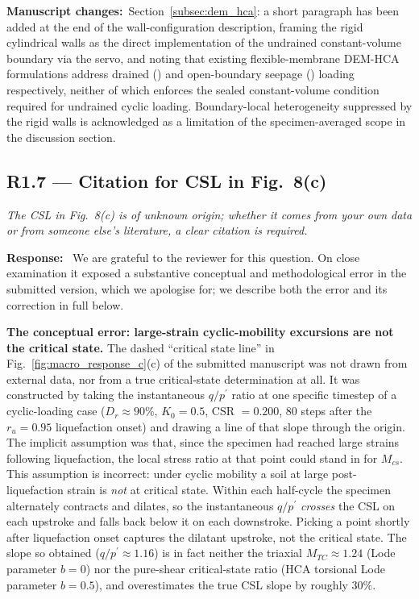 \documentclass[11pt,a4paper]{article}
\newenvironment{rcomment}
  {\begin{leftbar}\color{black!75}\itshape}
  {\end{leftbar}\vspace{0.3em}}
\newcommand{\response}{\par\noindent\textbf{Response:}\ \ignorespaces}
\newcommand{\changed}[1]{\par\noindent\textbf{Manuscript changes:}\ #1\par}
\newcommand{\Kzero}{\ensuremath{K_0}}
\newcommand{\ru}{\ensuremath{r_u}}
\begin{document}
\changed{Section~\ref{subsec:dem_hca}: a short paragraph has been
added at the end of the wall-configuration description, framing the
rigid cylindrical walls as the direct implementation of the undrained
constant-volume boundary via the servo, and noting that existing
flexible-membrane DEM-HCA formulations address drained
(\citealp{Song2024}) and open-boundary seepage
(\citealp{Song2024suffusion}) loading respectively, neither of which
enforces the sealed constant-volume condition required for undrained
cyclic loading. Boundary-local heterogeneity suppressed by the rigid
walls is acknowledged as a limitation of the specimen-averaged scope
in the discussion section.}

\subsection*{R1.7 --- Citation for CSL in Fig.~8(c)}

\begin{rcomment}
The CSL in Fig.~8(c) is of unknown origin; whether it comes from your own
data or from someone else's literature, a clear citation is required.
\end{rcomment}

\response
We are grateful to the reviewer for this question. On close
examination it exposed a substantive conceptual and methodological
error in the submitted version, which we apologise for; we describe
both the error and its correction in full below.

\medskip
\noindent\textbf{The conceptual error: large-strain cyclic-mobility
excursions are not the critical state.}
The dashed ``critical state line'' in
Fig.~\ref{fig:macro_response_c}(c) of the submitted manuscript was
not drawn from external data, nor from a true critical-state
determination at all. It was constructed by taking the instantaneous
$q/p^{\prime}$ ratio at one specific timestep of a cyclic-loading
case ($D_r\approx 90\%$, $\Kzero=0.5$, CSR $=0.200$, 80 steps after
the $\ru=0.95$ liquefaction onset) and drawing a line of that slope
through the origin. The implicit assumption was that, since the
specimen had reached large strains following liquefaction, the
local stress ratio at that point could stand in for $M_{cs}$. This
assumption is incorrect: under cyclic mobility a soil at large
post-liquefaction strain is \emph{not} at critical state. Within
each half-cycle the specimen alternately contracts and dilates,
so the instantaneous $q/p^{\prime}$ \emph{crosses} the CSL on each
upstroke and falls back below it on each downstroke. Picking a
point shortly after liquefaction onset captures the dilatant
upstroke, not the critical state. The slope so obtained
($q/p^{\prime}\approx 1.16$) is in fact neither the triaxial
$M_{TC}\approx 1.24$ (Lode parameter $b=0$) nor the pure-shear
critical-state ratio (HCA torsional Lode parameter $b=0.5$),
and overestimates the true CSL slope by roughly $30\%$.
\end{document}
